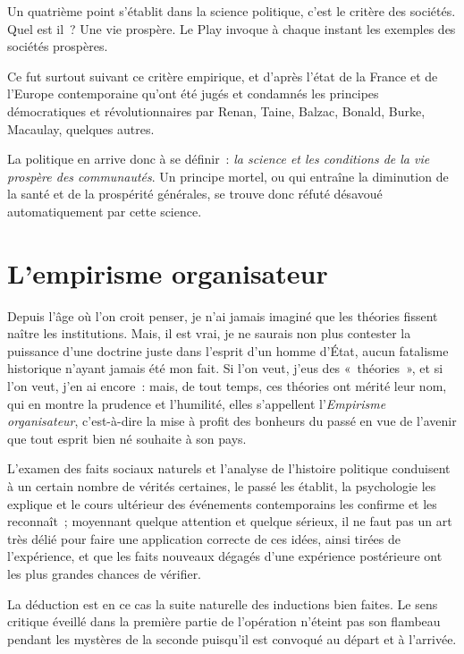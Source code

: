 \documentclass[french,twoside]{book} %
\newcommand{\astermono}{\medskip\centerline{\color{rubric}\large\selectfont{\syms ✻}}\medskip\par}%
\begin{document}
\astermono

\noindent Un quatrième point s’établit dans la science politique, c’est le critère des sociétés. Quel est il ? Une vie prospère. Le Play invoque à chaque instant les exemples des sociétés prospères.\par
Ce fut surtout suivant ce critère empirique, et d’après l’état de la France et de l’Europe contemporaine qu’ont été jugés et condamnés les principes démocratiques et révolutionnaires par Renan, Taine, Balzac, Bonald, Burke, Macaulay, quelques autres.\par
La politique en arrive donc à se définir : \emph{la science et les conditions de la vie prospère des communautés}. Un principe mortel, ou qui entraîne la diminution de la santé et de la prospérité générales, se trouve donc réfuté désavoué automatiquement par cette science.
\section[{L’empirisme organisateur}]{L’empirisme organisateur}
\noindent Depuis l’âge où l’on croit penser, je n’ai jamais imaginé que les théories fissent naître les institutions. Mais, il est vrai, je ne saurais non plus contester la puissance d’une doctrine juste dans l’esprit d’un homme d’État, aucun fatalisme historique n’ayant jamais été mon fait. Si l’on veut, j’eus des « théories », et si l’on veut, j’en ai encore : mais, de tout temps, ces théories ont mérité leur nom, qui en montre la prudence et l’humilité, elles s’appellent l’\emph{Empirisme organisateur}, c’est-à-dire la mise à profit des bonheurs du passé en vue de l’avenir que tout esprit bien né souhaite à son pays.\par
L’examen des faits sociaux naturels et l’analyse de l’histoire politique conduisent à un certain nombre de vérités certaines, le passé les établit, la psychologie les explique et le cours ultérieur des événements contemporains les confirme et les reconnaît ; moyennant quelque attention et quelque sérieux, il ne faut pas un art très délié pour faire une application correcte de ces idées, ainsi tirées de l’expérience, et que les faits nouveaux dégagés d’une expérience postérieure ont les plus grandes chances de vérifier.\par
La déduction est en ce cas la suite naturelle des inductions bien faites. Le sens critique éveillé dans la première partie de l’opération n’éteint pas son flambeau pendant les mystères de la seconde puisqu’il est convoqué au départ et à l’arrivée.\par
\end{document}
